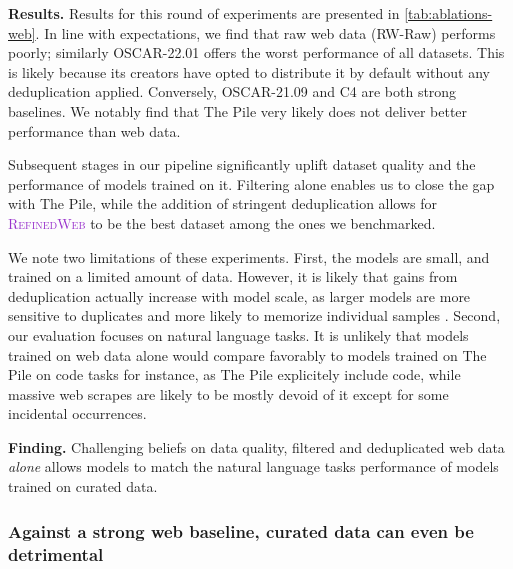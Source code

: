 \documentclass{article}
\DeclareRobustCommand{\data}[1]{\textcolor{DarkOrchid}{#1}}
\begin{document}
\textbf{Results.} Results for this round of experiments are presented in \cref{tab:ablations-web}. In line with expectations, we find that raw web data (RW-Raw) performs poorly; similarly OSCAR-22.01 offers the worst performance of all datasets. This is likely because its creators have opted to distribute it by default without any deduplication applied. Conversely, OSCAR-21.09 and C4 are both strong baselines. We notably find that The Pile very likely does not deliver better performance than web data. 

Subsequent stages in our pipeline significantly uplift dataset quality and the performance of models trained on it. Filtering alone enables us to close the gap with The Pile, while the addition of stringent deduplication allows for \data{\textsc{RefinedWeb}} to be the best dataset among the ones we benchmarked. 

We note two limitations of these experiments. First, the models are small, and trained on a limited amount of data. However, it is likely that gains from deduplication actually increase with model scale, as larger models are more sensitive to duplicates \citep{hernandez2022scaling} and more likely to memorize individual samples \citep{carlini2022quantifying}. Second, our evaluation focuses on natural language tasks. It is unlikely that models trained on web data alone would compare favorably to models trained on The Pile on code tasks for instance, as The Pile explicitely include code, while massive web scrapes are likely to be mostly devoid of it except for some incidental occurrences.


\begin{mdframed}
\textbf{Finding.} Challenging beliefs on data quality, filtered and deduplicated web data \emph{alone} allows models to match the natural language tasks performance of models trained on curated data.
\end{mdframed}

\subsubsection{Against a strong web baseline, curated data can even be detrimental}
\label{sec:curated_exp}
\end{document}
